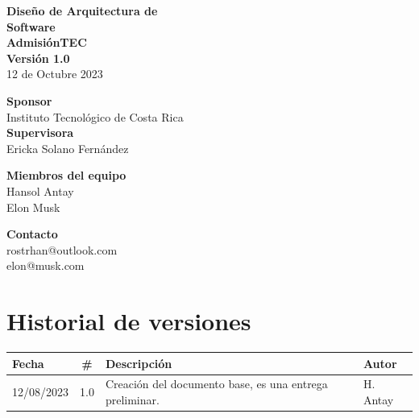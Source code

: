 \documentclass[12pt,a4paper]{article}
\newcommand{\nProyecto}{AdmisiónTEC}
\newcommand{\nVersion}{Versión 1.0}
\newcommand{\nSponsor}{Instituto Tecnológico de Costa Rica}
\newcommand{\nSupervisor}{Ericka Solano Fernández}
\begin{document}
\begin{minipage}{0.3\textwidth}
\end{minipage}
\hfill
\begin{minipage}{0.7\textwidth}
  
  \textbf{\Huge Diseño de Arquitectura de}\\
  \textbf{\Huge Software}\\[0.8cm]
  \textbf{\LARGE \nProyecto}\\[0.3cm]
  \textbf{\Large \nVersion}\\[0.2cm]
  12 de Octubre 2023
  
  \vspace{1.2cm}
  \large
  \textbf{Sponsor} \\
  \nSponsor \\
  \textbf{Supervisora} \\
  \nSupervisor

  \vspace{2cm}
  
  \begin{multicols}{2}
      \large
      \textbf{Miembros del equipo}\\
      Hansol Antay\\
      Elon Musk\\
      
      \columnbreak
      
      \textbf{Contacto}\\
      rostrhan@outlook.com\\
      elon@musk.com
  \end{multicols}
  
\end{minipage}

\vfill

\newpage

\tableofcontents

\newpage

\section*{Historial de versiones}

\begin{table}[h!]
  \centering
  \begin{tabular}{l c p{10cm} l}
      \rowcolor{lightgray}
      Fecha & \# & Descripción & Autor \\
      \midrule
      12/08/2023 & 
      1.0 & 
      Creación del documento base, es una entrega preliminar. & 
      H. Antay \\
      \bottomrule
  \end{tabular}
  \label{tab:historialversiones}
\end{table}
\end{document}
